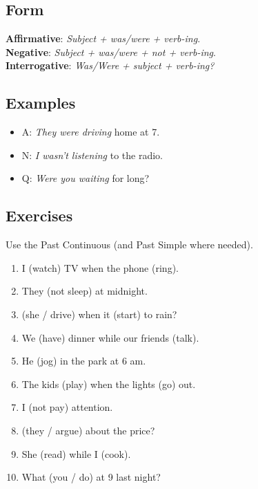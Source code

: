 \documentclass[11pt,a4paper]{article}
\begin{document}
\subsection*{Form}
\textbf{Affirmative}: \emph{Subject + was/were + verb-ing}.\\
\textbf{Negative}: \emph{Subject + was/were + not + verb-ing}.\\
\textbf{Interrogative}: \emph{Was/Were + subject + verb-ing?}

\subsection*{Examples}
\begin{itemize}
  \item A: \emph{They were driving} home at 7.
  \item N: \emph{I wasn’t listening} to the radio.
  \item Q: \emph{Were you waiting} for long?
\end{itemize}

\subsection*{Exercises}
Use the Past Continuous (and Past Simple where needed).
\begin{enumerate}
  \item I \underline{\hspace{2.5cm}} (watch) TV when the phone \underline{\hspace{2.5cm}} (ring).
  \item They \underline{\hspace{2.5cm}} (not sleep) at midnight.
  \item \underline{\hspace{2.5cm}} (she / drive) when it \underline{\hspace{2.5cm}} (start) to rain?
  \item We \underline{\hspace{2.5cm}} (have) dinner while our friends \underline{\hspace{2.5cm}} (talk).
  \item He \underline{\hspace{2.5cm}} (jog) in the park at 6 am.
  \item The kids \underline{\hspace{2.5cm}} (play) when the lights \underline{\hspace{2.5cm}} (go) out.
  \item I \underline{\hspace{2.5cm}} (not pay) attention.
  \item \underline{\hspace{2.5cm}} (they / argue) about the price?
  \item She \underline{\hspace{2.5cm}} (read) while I \underline{\hspace{2.5cm}} (cook).
  \item What \underline{\hspace{2.5cm}} (you / do) at 9 last night?
\end{enumerate}
\end{document}
